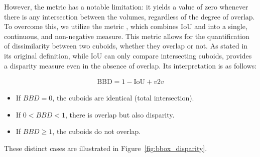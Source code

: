 However, the  metric has a notable limitation: it yields a value of zero whenever there is any intersection between the volumes, regardless of the degree of overlap. To overcome this, we utilize the  metric \cite{bounding_box_disparity}, which combines IoU and  into a single, continuous, and non-negative measure. This metric allows for the quantification of dissimilarity between two cuboids, whether they overlap or not. As stated in its original definition, while IoU can only compare intersecting cuboids,  provides a disparity measure even in the absence of overlap. Its interpretation is as follows:

\begin{equation}
    \begin{aligned}
    \text{BBD} = 1 - \text{IoU} + v2v
    \end{aligned}
    \label{eq:3d_metrics}
\end{equation}

\begin{itemize}
    \item If $BBD = 0$, the cuboids are identical (total intersection).
    \item If $0 < BBD < 1$, there is overlap but also disparity.
    \item If $BBD \geq 1$, the cuboids do not overlap.
\end{itemize}

These distinct cases are illustrated in Figure~\ref{fig:bbox_disparity}.

